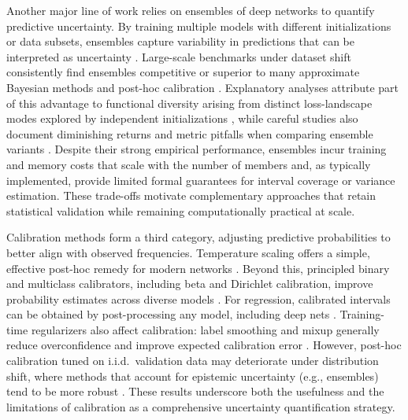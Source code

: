 \documentclass[12pt, titlepage, reqno]{article}
\begin{document}
Another major line of work relies on ensembles of deep networks to
quantify predictive uncertainty. By training multiple models with
different initializations or data subsets, ensembles capture
variability in predictions that can be interpreted as uncertainty
\citep{lakshminarayanan2017simple}. Large-scale benchmarks under
dataset shift consistently find ensembles competitive or superior to
many approximate Bayesian methods and post-hoc calibration
\citep{ovadia2019can}. Explanatory analyses attribute part of this
advantage to functional diversity arising from distinct loss-landscape
modes explored by independent initializations \citep{fort2019deep},
while careful studies also document diminishing returns and metric
pitfalls when comparing ensemble variants \citep{ashukha2020pitfalls}.
Despite their strong empirical performance, ensembles incur training
and memory costs that scale with the number of members and, as
typically implemented, provide limited formal guarantees for interval
coverage or variance estimation. These trade-offs motivate
complementary approaches that retain statistical validation while
remaining computationally practical at scale.


Calibration methods form a third category, adjusting predictive
probabilities to better align with observed frequencies. Temperature
scaling offers a simple, effective post-hoc remedy for modern networks
\citep{guo2017calibration}. Beyond this, principled binary and
multiclass calibrators, including beta and Dirichlet calibration,
improve probability estimates across diverse models
\citep{kull2017beta, kull2019beyond}. For regression, calibrated
intervals can be obtained by post-processing any model, including deep
nets \citep{kuleshov2018accurate}. Training-time regularizers also
affect calibration: label smoothing and mixup generally reduce
overconfidence and improve expected calibration error
\citep{muller2019when, thulasidasan2019mixup}. However, post-hoc
calibration tuned on i.i.d.\ validation data may deteriorate under
distribution shift, where methods that account for epistemic
uncertainty (e.g., ensembles) tend to be more robust
\citep{ovadia2019can}. These results underscore both the usefulness
and the limitations of calibration as a comprehensive uncertainty
quantification strategy.
\end{document}
